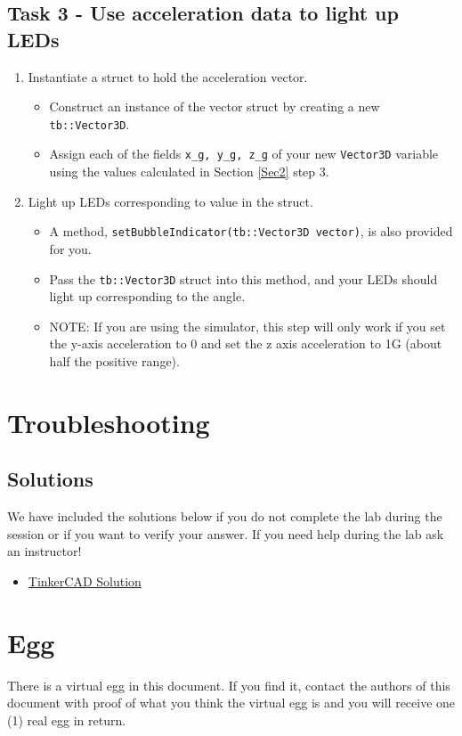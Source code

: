\documentclass{article}
\begin{document}
    \subsection{Task 3 - Use acceleration data to light up LEDs}
        \begin{enumerate}
            \item Instantiate a struct to hold the acceleration vector.
            \begin{itemize}
                \item Construct an instance of the vector struct by creating a new \texttt{tb::Vector3D}. 
                \item Assign each of the fields \texttt{x\_g, y\_g, z\_g}  of your new \texttt{Vector3D} variable using the values calculated in Section \ref{Sec2} step 3. 
            \end{itemize}
            \item Light up LEDs corresponding to value in the struct.
            \begin{itemize}
                \item A method, \texttt{setBubbleIndicator(tb::Vector3D vector)}, is also provided for you.
                \item Pass the \texttt{tb::Vector3D} struct into this method, and your LEDs should light up corresponding to the angle. 
                \item NOTE: If you are using the simulator, this step will only work if you set the y-axis acceleration to 0 and set the z axis acceleration to 1G (about half the positive range).
            \end{itemize}
        \end{enumerate}
    

\section{Troubleshooting}
    \subsection{Solutions}
    We have included the solutions below if you do not complete the lab during the session or if you want to verify your answer. If you need help during the lab ask an instructor!
\begin{itemize}
    \item \href{https://www.tinkercad.com/things/lFJojnkgwTw}{TinkerCAD Solution}
    \end{itemize}
    
    \section{Egg}
    There is a virtual egg in this document. If you find it, contact the authors of this document with proof of what you think the virtual egg is and you will receive one (1) real egg in return. 
\end{document}

